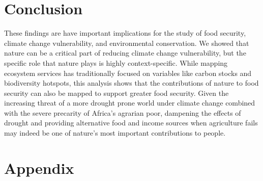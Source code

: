\documentclass{article}
\begin{document}
\section{Conclusion}
These findings are have important implications for the study of food security, climate change vulnerability, and environmental conservation.  We showed that nature can be a critical part of reducing climate change vulnerability, but the specific role that nature plays is highly context-specific.  While mapping ecosystem services has traditionally focused on variables like carbon stocks and biodiversity hotspots, this analysis shows that the contributions of nature to food security can also be mapped to support greater food security.  Given the increasing threat of a more drought prone world under climate change \cite{Dai2013} combined with the severe precarity of Africa's agrarian poor, dampening the effects of drought and providing alternative food and income sources when agriculture fails may indeed be one of nature's most important contributions to people.





\setcounter{section}{0}
\renewcommand{\thetable}{A\arabic{section}}
\section*{Appendix} \label{AppendixA}
\setcounter{table}{0}
\setcounter{figure}{0}
\renewcommand{\thetable}{A\arabic{table}}
\renewcommand{\thefigure}{A\arabic{figure}}



\end{document}
